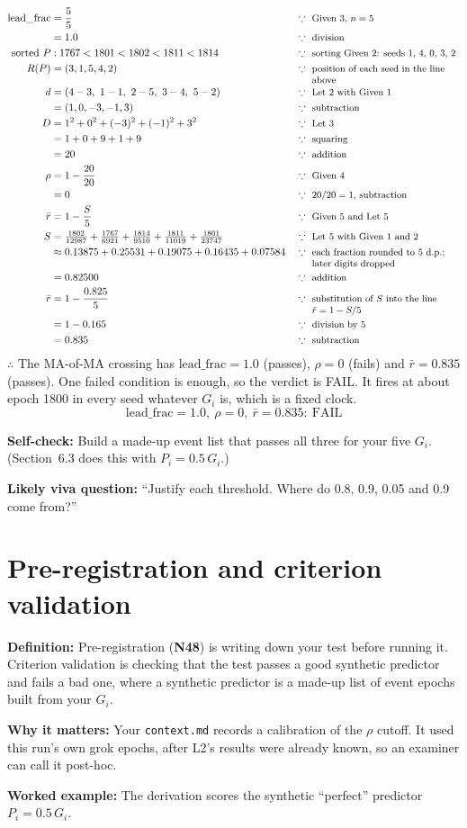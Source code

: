 \documentclass[11pt,a4paper,oneside,openany]{report}
\newcommand{\leadfrac}{\mathrm{lead\_frac}}
\newcommand{\rbar}{\bar{r}}
\newcommand{\code}[1]{\texttt{#1}}
\newcommand{\gl}[1]{\textbf{#1}}   %
\newcommand{\why}[1]{\because\ \parbox[t]{5.0cm}{\raggedright\small #1}}
\newcommand{\fdef}{\textbf{Definition:} }
\newcommand{\fwhy}{\par\textbf{Why it matters:} }
\newcommand{\fex}{\par\textbf{Worked example:} }
\newcommand{\fself}{\par\textbf{Self-check:} }
\newcommand{\fviva}{\par\textbf{Likely viva question:} }
\begin{document}
\begin{align*}
\leadfrac &= \frac{5}{5} && \why{Given 3, $n = 5$} \\
          &= 1.0 && \why{division} \\
\text{sorted } P &: 1767 < 1801 < 1802 < 1811 < 1814 && \why{sorting Given 2: seeds 1, 4, 0, 3, 2} \\
R(P) &= (3, 1, 5, 4, 2) && \why{position of each seed in the line above} \\
d &= (4-3,\ 1-1,\ 2-5,\ 3-4,\ 5-2) && \why{Let 2 with Given 1} \\
  &= (1, 0, -3, -1, 3) && \why{subtraction} \\
D &= 1^2 + 0^2 + (-3)^2 + (-1)^2 + 3^2 && \why{Let 3} \\
  &= 1 + 0 + 9 + 1 + 9 && \why{squaring} \\
  &= 20 && \why{addition} \\
\rho &= 1 - \frac{20}{20} && \why{Given 4} \\
     &= 0 && \why{$20/20 = 1$, subtraction} \\
\rbar &= 1 - \frac{S}{5} && \why{Given 5 and Let 5} \\
S &= \tfrac{1802}{12987} + \tfrac{1767}{6921} + \tfrac{1814}{9510} + \tfrac{1811}{11019} + \tfrac{1801}{23747} && \why{Let 5 with Given 1 and 2} \\
  &\approx 0.13875 + 0.25531 + 0.19075 + 0.16435 + 0.07584 && \why{each fraction rounded to 5 d.p.; later digits dropped} \\
  &= 0.82500 && \why{addition} \\
\rbar &= 1 - \frac{0.825}{5} && \why{substitution of $S$ into the line $\rbar = 1 - S/5$} \\
      &= 1 - 0.165 && \why{division by 5} \\
      &= 0.835 && \why{subtraction}
\end{align*}
$\therefore$ The MA-of-MA crossing has $\leadfrac = 1.0$ (passes), $\rho = 0$ (fails) and $\rbar = 0.835$ (passes). One failed condition is enough, so the verdict is FAIL. It fires at about epoch 1800 in every seed whatever $G_i$ is, which is a fixed clock.
\[\boxed{\leadfrac = 1.0, \ \rho = 0, \ \rbar = 0.835: \ \text{FAIL}}\]

\fself Build a made-up event list that passes all three for your five $G_i$. (Section~6.3 does this with $P_i = 0.5\,G_i$.)
\fviva ``Justify each threshold. Where do 0.8, 0.9, 0.05 and 0.9 come from?''

\section{Pre-registration and criterion validation}
\fdef Pre-registration (\gl{N48}) is writing down your test before running it. Criterion validation is checking that the test passes a good synthetic predictor and fails a bad one, where a synthetic predictor is a made-up list of event epochs built from your $G_i$.
\fwhy Your \code{context.md} records a calibration of the $\rho$ cutoff. It used this run's own grok epochs, after L2's results were already known, so an examiner can call it post-hoc.
\fex The derivation scores the synthetic ``perfect'' predictor $P_i = 0.5\,G_i$.
\end{document}
